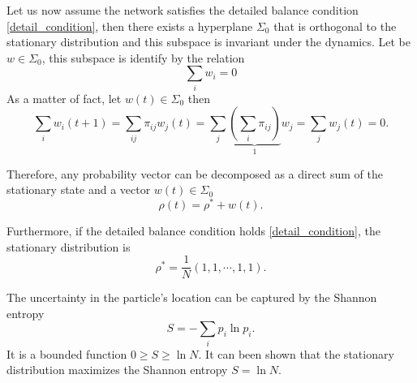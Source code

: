 
Let us now assume the network satisfies the detailed balance condition \eqref{detail_condition}, then there exists a hyperplane $\Sigma_0$ that is orthogonal to the stationary distribution and this subspace is invariant under the dynamics. Let be $w \in \Sigma_0$, this subspace is identify by the relation
\begin{equation}
    \sum_i w_i = 0 
\end{equation}
As a matter of fact, let $w(t) \in \Sigma_0$ then 
\begin{equation}
    \sum_i w_i(t+1) = \sum_{ij} \pi_{ij} w_j(t) = \sum_j \underbrace{\left(\sum_i \pi_{ij}\right)}_{1} w_j = \sum_j w_j(t) = 0.
\end{equation}

Therefore, any probability vector can be decomposed as a direct sum of the stationary state and a vector $w(t) \in \Sigma_0$ 
\begin{equation}
    \rho(t) = \rho^* + w(t).
\end{equation}

Furthermore, if the detailed balance condition holds \eqref{detail_condition}, the stationary distribution  is \cite{Classic_random_walk}
\begin{equation}
    \rho^* = \frac{1}{N} \left(1,1,\cdots,1,1\right).
\end{equation} 

The uncertainty in the particle's location can be captured by the Shannon entropy
\begin{equation}
    S = -\sum_i p_i\ln p_i.
\end{equation}
It is a bounded function $0\geq S \geq \ln N$.
It can been shown that the stationary distribution maximizes the Shannon entropy $S = \ln N$.
    
